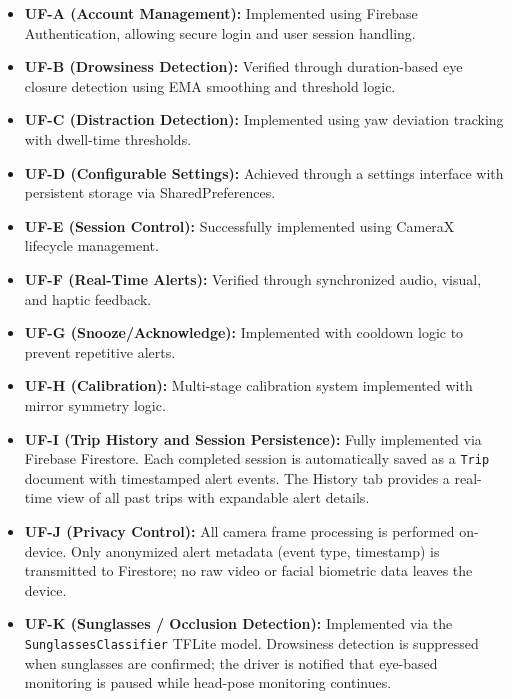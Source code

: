 \documentclass[11pt]{report}
\begin{document}
\begin{itemize}
    \item \textbf{UF-A (Account Management):} Implemented using Firebase Authentication, allowing secure login and user session handling.

    \item \textbf{UF-B (Drowsiness Detection):} Verified through duration-based eye closure detection using EMA smoothing and threshold logic.

    \item \textbf{UF-C (Distraction Detection):} Implemented using yaw deviation tracking with dwell-time thresholds.

    \item \textbf{UF-D (Configurable Settings):} Achieved through a settings interface with persistent storage via SharedPreferences.

    \item \textbf{UF-E (Session Control):} Successfully implemented using CameraX lifecycle management.

    \item \textbf{UF-F (Real-Time Alerts):} Verified through synchronized audio, visual, and haptic feedback.

    \item \textbf{UF-G (Snooze/Acknowledge):} Implemented with cooldown logic to prevent repetitive alerts.

    \item \textbf{UF-H (Calibration):} Multi-stage calibration system implemented with mirror symmetry logic.

    \item \textbf{UF-I (Trip History and Session Persistence):} Fully implemented via Firebase Firestore. Each completed session is automatically saved as a \texttt{Trip} document with timestamped alert events. The History tab provides a real-time view of all past trips with expandable alert details.

    \item \textbf{UF-J (Privacy Control):} All camera frame processing is performed on-device. Only anonymized alert metadata (event type, timestamp) is transmitted to Firestore; no raw video or facial biometric data leaves the device.

    \item \textbf{UF-K (Sunglasses / Occlusion Detection):} Implemented via the \texttt{SunglassesClassifier} TFLite model. Drowsiness detection is suppressed when sunglasses are confirmed; the driver is notified that eye-based monitoring is paused while head-pose monitoring continues.
\end{itemize}
\end{document}
